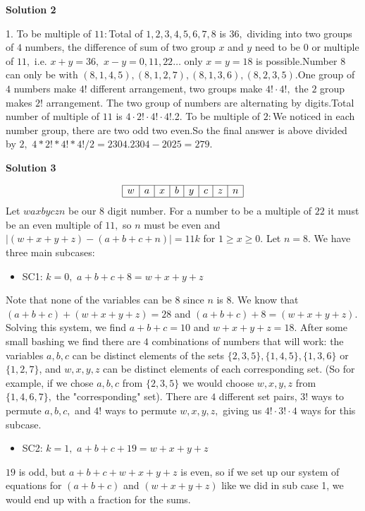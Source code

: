 \begin{enumerate}
\textbf{Solution 2}

1. To be multiple of $11:$Total of $1,2,3,4,5,6,7,8$ is $36,$ dividing into two groups of $4$ numbers, the difference of sum of two group $x$ and $y$ need to be $0$ or multiple of $11,$ i.e. $x+y=36,$ $x-y=0,11,22\dots$ only $x=y=18$ is possible.Number $8$ can only be with $(8,1,4,5),(8,1,2,7),(8,1,3,6),(8,2,3,5).$One group of $4$ numbers make $4!$ different arrangement, two groups make $4!\cdot{4!},$ the $2$ group makes $2!$ arrangement. The two group of numbers are alternating by digits.Total number of multiple of $11$ is $4\cdot 2!\cdot 4!\cdot 4!.$2. To be multiple of $2:$We noticed in each number group, there are two odd two even.So the final answer is above divided by $2,$ $4*2!*4!*4!/2=2304.$$2304-2025=\boxed{279.}$




\textbf{Solution 3}


 \[\begin{array}{|c|c|c|c|c|c|c|c|} \hline w & a & x & b & y & c & z & n \\ \hline \end{array}\]Let $waxbyczn$ be our 8 digit number. For a number to be a multiple of $22$ it must be an even multiple of $11,$ so $n$ must be even and $|(w + x + y + z) - (a + b + c + n)| = 11k$ for $1 \geq x \geq 0.$ Let $n = 8.$ We have three main subcases:

 
            \begin{itemize}
        \item SC1: $k = 0,$ $a + b + c + 8 = w + x + y + z$
            \end{itemize}
            Note that none of the variables can be $8$ since $n$ is $8$. We know that $(a + b + c) + (w + x + y + z) = 28$ and $(a + b + c) + 8 = (w + x + y + z).$ Solving this system, we find $a + b + c = 10$ and $w + x + y + z = 18.$ After some small bashing we find there are $4$ combinations of numbers that will work: the variables $a, b, c$ can be distinct elements of the sets $\{2, 3, 5\}, \{1, 4, 5\}, \{1, 3, 6\}$ or $\{1, 2, 7\}$, and $w, x, y, z$ can be distinct elements of each corresponding set. (So for example, if we chose $a, b, c$ from $\{2, 3, 5\}$ we would choose $w, x, y, z$ from $\{1, 4, 6, 7\},$ the "corresponding" set). There are $4$ different set pairs, $3!$ ways to permute $a, b, c,$ and $4!$ ways to permute $w, x, y, z,$ giving us $4! \cdot 3! \cdot 4$ ways for this subcase. 

 
            \begin{itemize}
        \item SC2: $k = 1,$ $a + b + c + 19 = w + x + y + z$
            \end{itemize}
            $19$ is odd, but $a + b + c + w + x + y + z$ is even, so if we set up our system of equations for $(a + b + c)$ and $(w + x + y + z)$ like we did in sub case 1, we would end up with a fraction for the sums.


\end{enumerate}
